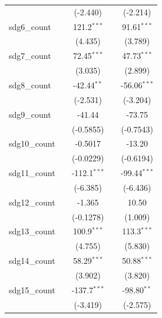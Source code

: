 \begin{tabular}{lcccc}
                     &                & (-2.440)       &                & (-2.214)\\   
   sdg6\_count       &                & 121.2$^{***}$  &                & 91.61$^{***}$\\   
                     &                & (4.435)        &                & (3.789)\\   
   sdg7\_count       &                & 72.45$^{***}$  &                & 47.73$^{***}$\\   
                     &                & (3.035)        &                & (2.899)\\   
   sdg8\_count       &                & -42.44$^{**}$  &                & -56.06$^{***}$\\   
                     &                & (-2.531)       &                & (-3.204)\\   
   sdg9\_count       &                & -41.44         &                & -73.75\\   
                     &                & (-0.5855)      &                & (-0.7543)\\   
   sdg10\_count      &                & -0.5017        &                & -13.20\\   
                     &                & (-0.0229)      &                & (-0.6194)\\   
   sdg11\_count      &                & -112.1$^{***}$ &                & -99.44$^{***}$\\   
                     &                & (-6.385)       &                & (-6.436)\\   
   sdg12\_count      &                & -1.365         &                & 10.50\\   
                     &                & (-0.1278)      &                & (1.009)\\   
   sdg13\_count      &                & 100.9$^{***}$  &                & 113.3$^{***}$\\   
                     &                & (4.755)        &                & (5.830)\\   
   sdg14\_count      &                & 58.29$^{***}$  &                & 50.88$^{***}$\\   
                     &                & (3.902)        &                & (3.820)\\   
   sdg15\_count      &                & -137.7$^{***}$ &                & -98.80$^{**}$\\   
                     &                & (-3.419)       &                & (-2.575)\\   

\end{tabular}
